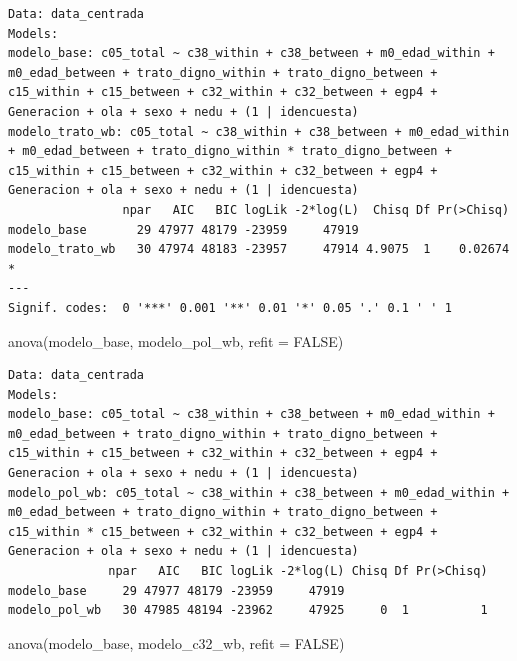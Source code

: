 \documentclass[
  spanish,
  a4paper,
  oneside]{scrbook}
\newenvironment{Shaded}{\begin{snugshade}}{\end{snugshade}}
\newcommand{\AttributeTok}[1]{\textcolor[rgb]{0.40,0.45,0.13}{#1}}
\newcommand{\ConstantTok}[1]{\textcolor[rgb]{0.56,0.35,0.01}{#1}}
\newcommand{\FunctionTok}[1]{\textcolor[rgb]{0.28,0.35,0.67}{#1}}
\newcommand{\NormalTok}[1]{\textcolor[rgb]{0.00,0.23,0.31}{#1}}
\begin{document}
\begin{verbatim}
Data: data_centrada
Models:
modelo_base: c05_total ~ c38_within + c38_between + m0_edad_within + m0_edad_between + trato_digno_within + trato_digno_between + c15_within + c15_between + c32_within + c32_between + egp4 + Generacion + ola + sexo + nedu + (1 | idencuesta)
modelo_trato_wb: c05_total ~ c38_within + c38_between + m0_edad_within + m0_edad_between + trato_digno_within * trato_digno_between + c15_within + c15_between + c32_within + c32_between + egp4 + Generacion + ola + sexo + nedu + (1 | idencuesta)
                npar   AIC   BIC logLik -2*log(L)  Chisq Df Pr(>Chisq)  
modelo_base       29 47977 48179 -23959     47919                       
modelo_trato_wb   30 47974 48183 -23957     47914 4.9075  1    0.02674 *
---
Signif. codes:  0 '***' 0.001 '**' 0.01 '*' 0.05 '.' 0.1 ' ' 1
\end{verbatim}

\begin{Shaded}
\begin{Highlighting}[]
\FunctionTok{anova}\NormalTok{(modelo\_base, modelo\_pol\_wb,   }\AttributeTok{refit =} \ConstantTok{FALSE}\NormalTok{)}
\end{Highlighting}
\end{Shaded}

\begin{verbatim}
Data: data_centrada
Models:
modelo_base: c05_total ~ c38_within + c38_between + m0_edad_within + m0_edad_between + trato_digno_within + trato_digno_between + c15_within + c15_between + c32_within + c32_between + egp4 + Generacion + ola + sexo + nedu + (1 | idencuesta)
modelo_pol_wb: c05_total ~ c38_within + c38_between + m0_edad_within + m0_edad_between + trato_digno_within + trato_digno_between + c15_within * c15_between + c32_within + c32_between + egp4 + Generacion + ola + sexo + nedu + (1 | idencuesta)
              npar   AIC   BIC logLik -2*log(L) Chisq Df Pr(>Chisq)
modelo_base     29 47977 48179 -23959     47919                    
modelo_pol_wb   30 47985 48194 -23962     47925     0  1          1
\end{verbatim}

\begin{Shaded}
\begin{Highlighting}[]
\FunctionTok{anova}\NormalTok{(modelo\_base, modelo\_c32\_wb,   }\AttributeTok{refit =} \ConstantTok{FALSE}\NormalTok{)}
\end{Highlighting}
\end{Shaded}
\end{document}
